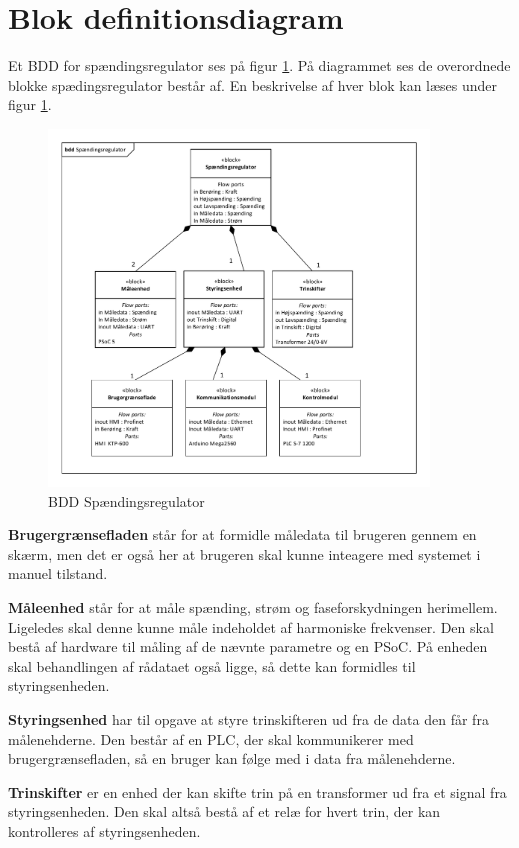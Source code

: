 
\section{Blok definitionsdiagram}
Et BDD for spændingsregulator ses på figur \ref{fig:BDDSpaendingsregulator}. På diagrammet ses de overordnede blokke spædingsregulator består af. En beskrivelse af hver blok kan læses under figur \ref{fig:BDDSpaendingsregulator}.

\begin{figure}[htbp] %
	\centering
	\includegraphics[width=0.9\textwidth]{Figure/BDDSpaendingsregulator}
	\caption{BDD Spændingsregulator}
	\label{fig:BDDSpaendingsregulator}
\end{figure}

\textbf{Brugergrænsefladen} står for at formidle måledata til brugeren gennem en skærm, men det er også her at brugeren skal kunne inteagere med systemet i manuel tilstand.

\textbf{Måleenhed} står for at måle spænding, strøm og faseforskydningen herimellem. Ligeledes skal denne kunne måle indeholdet af harmoniske frekvenser. Den skal bestå af hardware til måling af de nævnte parametre og en PSoC. På enheden skal behandlingen af rådataet også ligge, så dette kan formidles til styringsenheden.

\textbf{Styringsenhed} har til opgave at styre trinskifteren ud fra de data den får fra målenehderne. Den består af en PLC, der skal kommunikerer med brugergrænsefladen, så en bruger kan følge med i data fra målenehderne.

\textbf{Trinskifter} er en enhed der kan skifte trin på en transformer ud fra et signal fra styringsenheden. Den skal altså bestå af et relæ for hvert trin, der kan kontrolleres af styringsenheden.